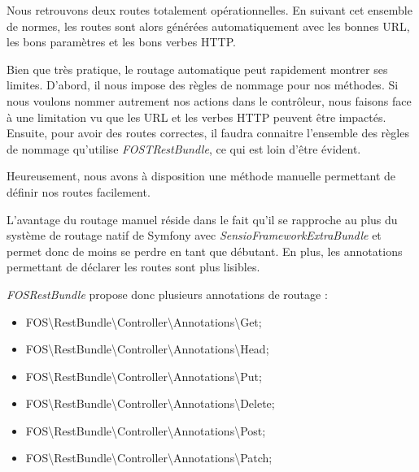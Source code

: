 \documentclass[big]{zmdocument}
\begin{document}
Nous retrouvons deux routes totalement opérationnelles. En suivant cet ensemble de normes, les routes sont alors générées automatiquement avec les bonnes URL, les bons paramètres et les bons verbes HTTP.





Bien que très pratique, le routage automatique peut rapidement montrer ses limites. 
D'abord, il nous impose des règles de nommage pour nos méthodes. Si nous voulons nommer autrement nos actions dans le contrôleur, nous faisons face à une limitation vu que les URL et les verbes HTTP peuvent être impactés. 
Ensuite, pour avoir des routes correctes, il faudra connaitre l'ensemble des règles de nommage qu'utilise \textit{FOSTRestBundle}, ce qui est loin d'être évident.



Heureusement, nous avons à disposition une méthode manuelle permettant de définir nos routes facilement.



L'avantage du routage manuel réside dans le fait qu'il se rapproche au plus du système de routage natif de Symfony avec \textit{SensioFrameworkExtraBundle} et permet donc de moins se perdre en tant que débutant. En plus, les annotations permettant de déclarer les routes sont plus lisibles.



\textit{FOSRestBundle} propose donc plusieurs annotations de routage :



\begin{itemize}
\item FOS\textbackslash{}RestBundle\textbackslash{}Controller\textbackslash{}Annotations\textbackslash{}Get;
\item FOS\textbackslash{}RestBundle\textbackslash{}Controller\textbackslash{}Annotations\textbackslash{}Head;
\item FOS\textbackslash{}RestBundle\textbackslash{}Controller\textbackslash{}Annotations\textbackslash{}Put;
\item FOS\textbackslash{}RestBundle\textbackslash{}Controller\textbackslash{}Annotations\textbackslash{}Delete;
\item FOS\textbackslash{}RestBundle\textbackslash{}Controller\textbackslash{}Annotations\textbackslash{}Post;
\item FOS\textbackslash{}RestBundle\textbackslash{}Controller\textbackslash{}Annotations\textbackslash{}Patch;
\end{itemize}
\end{document}

